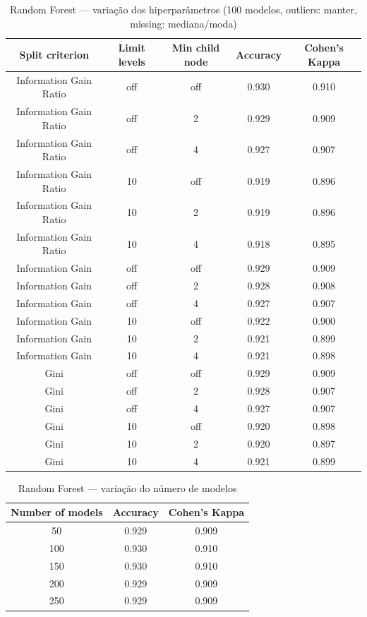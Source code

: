 \documentclass[11pt,a4paper]{article}
\begin{document}
\begin{table}[H]
    \centering
    \caption{Random Forest --- variação dos hiperparâmetros (100 modelos, outliers: manter, missing: mediana/moda)}
    \label{tab:rf_attr_hiperparametros}
    \begin{tabular}{ccccc}
    \toprule
    Split criterion & Limit levels & Min child node & Accuracy & Cohen's Kappa \\
    \midrule
    Information Gain Ratio & off & off & 0.930 & 0.910 \\
    Information Gain Ratio & off & 2 & 0.929 & 0.909 \\
    Information Gain Ratio & off & 4 & 0.927 & 0.907 \\
    Information Gain Ratio & 10 & off & 0.919 & 0.896 \\
    Information Gain Ratio & 10 & 2 & 0.919 & 0.896 \\
    Information Gain Ratio & 10 & 4 & 0.918 & 0.895 \\
    Information Gain & off & off & 0.929 & 0.909 \\
    Information Gain & off & 2 & 0.928 & 0.908 \\
    Information Gain & off & 4 & 0.927 & 0.907 \\
    Information Gain & 10 & off & 0.922 & 0.900 \\
    Information Gain & 10 & 2 & 0.921 & 0.899 \\
    Information Gain & 10 & 4 & 0.921 & 0.898 \\
    Gini & off & off & 0.929 & 0.909 \\
    Gini & off & 2 & 0.928 & 0.907 \\
    Gini & off & 4 & 0.927 & 0.907 \\
    Gini & 10 & off & 0.920 & 0.898 \\
    Gini & 10 & 2 & 0.920 & 0.897 \\
    Gini & 10 & 4 & 0.921 & 0.899 \\
    \bottomrule
    \end{tabular}
\end{table}

\begin{table}[H]
    \centering
    \caption{Random Forest --- variação do número de modelos}
    \label{tab:rf_attr_num_modelos}
    \begin{tabular}{ccc}
    \toprule
    Number of models & Accuracy & Cohen's Kappa \\
    \midrule
    50 & 0.929 & 0.909 \\
    100 & 0.930 & 0.910 \\
    150 & 0.930 & 0.910 \\
    200 & 0.929 & 0.909 \\
    250 & 0.929 & 0.909 \\
    \bottomrule
    \end{tabular}
\end{table}
\end{document}
